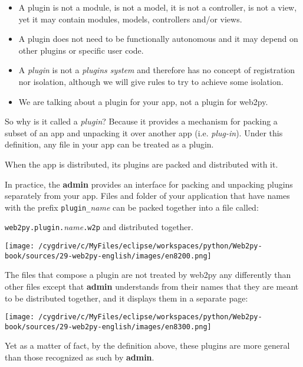 \documentclass[justified,sixbynine,notoc]{tufte-book}
\def\ft{\small\tt}
\begin{document}
\begin{fullwidth}
\begin{itemize}
\item A plugin is not a module, is not a model, it is not a controller, is not a view, yet it may contain modules, models, controllers and/or views.

\item A plugin does not need to be functionally autonomous and it may depend on other plugins or specific user code.

\item A {\it plugin} is not a {\it plugins system} and therefore has no concept of registration nor isolation, although we will give rules to try to achieve some isolation.

\item We are talking about a plugin for your app, not a plugin for web2py.
\end{itemize}

So why is it called a {\it plugin}? Because it provides a mechanism for packing a subset of an app and unpacking it over another app (i.e. {\it plug-in}). Under this definition, any file in your app can be treated as a plugin.

When the app is distributed, its plugins are packed and distributed with it.

In practice, the {\bf admin} provides an interface for packing and unpacking plugins separately from your app. Files and folder of your application that have names with the prefix {\ft plugin\_}{\it name} can be packed together into a file called:

{\ft web2py.plugin.}{\it name}{\ft .w2p}
\noindent and distributed together.


\goodbreak\begin{center}\texttt{[image: /cygdrive/c/MyFiles/eclipse/workspaces/python/Web2py-book/sources/29-web2py-english/images/en8200.png]}\end{center}


The files that compose a plugin are not treated by web2py any differently than other files except that {\bf admin} understands from their names that they are meant to be distributed together, and it displays them in a separate page:


\goodbreak\begin{center}\texttt{[image: /cygdrive/c/MyFiles/eclipse/workspaces/python/Web2py-book/sources/29-web2py-english/images/en8300.png]}\end{center}


Yet as a matter of fact, by the definition above, these plugins are more general than those recognized as such by {\bf admin}.


\end{fullwidth}
\end{document}
